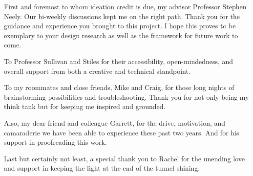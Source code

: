 
\setlength{\parskip}{1em}
\setlength{\parindent}{0em}

\noindent
First and foremost to whom ideation credit is due, my advisor Professor Stephen Neely. Our bi-weekly discussions kept me on the right path. Thank you for the guidance and experience you brought to this project. I hope this proves to be exemplary to your design research as well as the framework for future work to come.

To Professor Sullivan and Stiles for their accessibility, open-mindedness, and overall support from both a creative and technical standpoint.

To my roommates and close friends, Mike and Craig, for those long nights of brainstorming possibilities and troubleshooting. Thank you for not only being my think tank but for keeping me inspired and grounded.

Also, my dear friend and colleague Garrett, for the drive, motivation, and camaraderie we have been able to experience these past two years. And for his support in proofreading this work.

Last but certainly not least, a special thank you to Rachel for the unending love and support in keeping the light at the end of the tunnel shining.